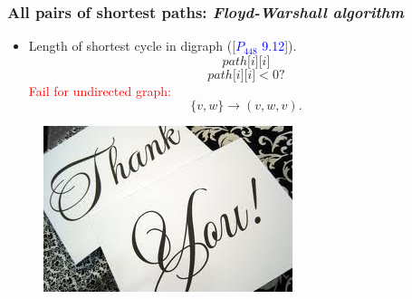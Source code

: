\begin{frame}
  \frametitle{All pairs of shortest paths: \emph{Floyd-Warshall algorithm}}

  \begin{itemize}
    \item Length of shortest cycle in digraph ([\textcolor{blue}{$P_{448}$ 9.12}]).
    \[
      path \lbrack i \rbrack \lbrack i \rbrack
    \]
    \[
      path \lbrack i \rbrack \lbrack i \rbrack < 0 ?
    \]
    \textcolor{red}{Fail for undirected graph:}
    \[
      \lbrace v, w \rbrace \to (v,w,v).
    \]
  \end{itemize}

\end{frame}


\begin{frame}
  \begin{figure}
    \begin{center}
      \includegraphics[scale=0.60]{figure/thank}
      \label{fig:thank}
    \end{center}
  \end{figure}
\end{frame} 